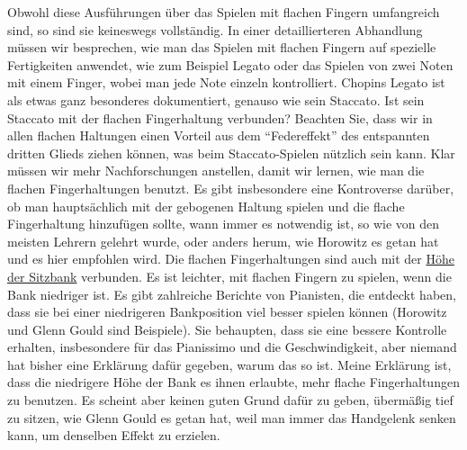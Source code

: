 Obwohl diese Ausführungen über das Spielen mit flachen Fingern umfangreich sind, so sind sie keineswegs vollständig.
In einer detaillierteren Abhandlung müssen wir besprechen, wie man das Spielen mit flachen Fingern auf spezielle Fertigkeiten anwendet, wie zum Beispiel Legato oder das Spielen von zwei Noten mit einem Finger, wobei man jede Note einzeln kontrolliert.
Chopins Legato ist als etwas ganz besonderes dokumentiert, genauso wie sein Staccato.
Ist sein Staccato mit der flachen Fingerhaltung verbunden?
Beachten Sie, dass wir in allen flachen Haltungen einen Vorteil aus dem \enquote{Federeffekt} des entspannten dritten Glieds ziehen können, was beim Staccato-Spielen nützlich sein kann.
Klar müssen wir mehr Nachforschungen anstellen, damit wir lernen, wie man die flachen Fingerhaltungen benutzt.
Es gibt insbesondere eine Kontroverse darüber, ob man hauptsächlich mit der gebogenen Haltung spielen und die flache Fingerhaltung hinzufügen sollte, wann immer es notwendig ist, so wie von den meisten Lehrern gelehrt wurde, oder anders herum, wie Horowitz es getan hat und es hier empfohlen wird.
Die flachen Fingerhaltungen sind auch mit der \hyperref[c1ii3]{Höhe der Sitzbank} verbunden.
Es ist leichter, mit flachen Fingern zu spielen, wenn die Bank niedriger ist.
Es gibt zahlreiche Berichte von Pianisten, die entdeckt haben, dass sie bei einer niedrigeren Bankposition viel besser spielen können (Horowitz und Glenn Gould sind Beispiele).
Sie behaupten, dass sie eine bessere Kontrolle erhalten, insbesondere für das Pianissimo und die Geschwindigkeit, aber niemand hat bisher eine Erklärung dafür gegeben, warum das so ist.
Meine Erklärung ist, dass die niedrigere Höhe der Bank es ihnen erlaubte, mehr flache Fingerhaltungen zu benutzen.
Es scheint aber keinen guten Grund dafür zu geben, übermäßig tief zu sitzen, wie Glenn Gould es getan hat, weil man immer das Handgelenk senken kann, um denselben Effekt zu erzielen.

